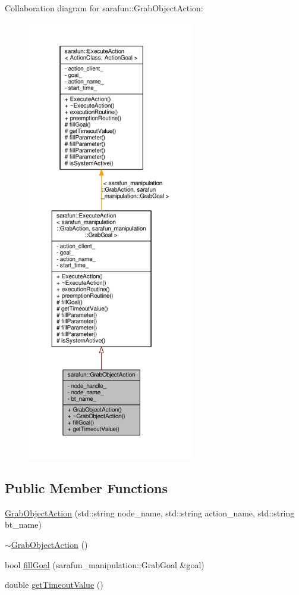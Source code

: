 Collaboration diagram for sarafun\-:\-:Grab\-Object\-Action\-:\nopagebreak
\begin{figure}[H]
\begin{center}
\leavevmode
\includegraphics[height=550pt]{d7/d04/classsarafun_1_1GrabObjectAction__coll__graph}
\end{center}
\end{figure}
\subsection*{Public Member Functions}
\begin{DoxyCompactItemize}
\item 
\hyperlink{classsarafun_1_1GrabObjectAction_abca8f2d915cf1a8d507d04885b3e1df9_abca8f2d915cf1a8d507d04885b3e1df9}{Grab\-Object\-Action} (std\-::string node\-\_\-name, std\-::string action\-\_\-name, std\-::string bt\-\_\-name)
\item 
\hyperlink{classsarafun_1_1GrabObjectAction_a1b1ee63f9ba24332b2184b67021dbf0e_a1b1ee63f9ba24332b2184b67021dbf0e}{$\sim$\-Grab\-Object\-Action} ()
\item 
bool \hyperlink{classsarafun_1_1GrabObjectAction_a61fe8b0cb93dec244f10d6c5dbee913c_a61fe8b0cb93dec244f10d6c5dbee913c}{fill\-Goal} (sarafun\-\_\-manipulation\-::\-Grab\-Goal \&goal)
\item 
double \hyperlink{classsarafun_1_1GrabObjectAction_a6e2ee834fda8bd8d0dbdc101c8acdd9c_a6e2ee834fda8bd8d0dbdc101c8acdd9c}{get\-Timeout\-Value} ()
\end{DoxyCompactItemize}

